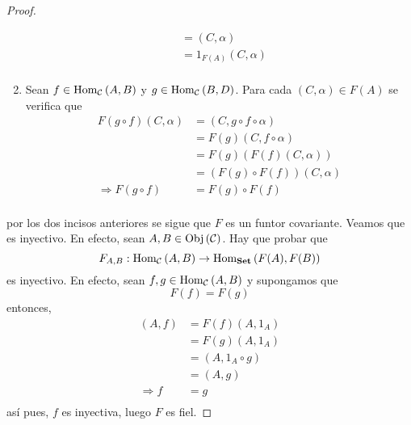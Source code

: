 \documentclass[12pt]{report}
\newcounter{it}
\theoremstyle{largebreak}
\newcommand{\Obj}[1]{\ensuremath{\textup{Obj}\left(#1\right)}}
\newcommand{\Hom}[3]{\ensuremath{\textup{Hom}_{#1}\left(#2,#3\right)}}
\newcommand{\Cat}[1]{\ensuremath{\textup{\textbf{#1}}}}
\begin{document}
\begin{proof}
\begin{enumerate}
\begin{equation*}
\begin{split}
                    &=(C,\alpha)\\
                    &=1_{ F(A)}(C,\alpha)\\
                \end{split}
            \end{equation*}
            \item Sean $f\in\Hom{\mathcal{C}}{A}{B}$ y $g\in\Hom{\mathcal{C}}{B}{D}$. Para cada $(C,\alpha)\in F(A)$ se verifica que
            \begin{equation*}
                \begin{split}
                    F(g\circ f)(C,\alpha)&=(C,g\circ f\circ \alpha)\\
                    &=F(g)(C,f\circ\alpha)\\
                    &=F(g)(F(f)(C,\alpha))\\
                    &=(F(g)\circ F(f))(C,\alpha)\\
                    \Rightarrow F(g\circ f)&=F(g)\circ F(f)\\
                \end{split}
            \end{equation*}
        \end{enumerate}
        por los dos incisos anteriores se sigue que $F$ es un funtor covariante.
        Veamos que es inyectivo. En efecto, sean $A,B\in\Obj{\mathcal{C}}$. Hay que probar que
        \begin{equation*}
            F_{A,B}:\Hom{\mathcal{C}}{A}{B}\rightarrow\Hom{\Cat{Set}}{F(A)}{F(B)}
        \end{equation*}
        es inyectivo. En efecto, sean $f,g\in\Hom{\mathcal{C}}{A}{B}$ y supongamos que
        \begin{equation*}
            F(f)=F(g)
        \end{equation*}
        entonces,
        \begin{equation*}
            \begin{split}
                (A,f)&=F(f)(A,1_A)\\
                &=F(g)(A,1_A)\\
                &=(A,1_A\circ g)\\
                &=(A,g)\\
                \Rightarrow f&=g\\
            \end{split}
        \end{equation*}
        así pues, $f$ es inyectiva, luego $F$ es fiel.
    \end{proof}
\end{document}
